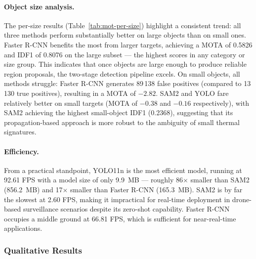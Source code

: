 \documentclass[
]{article}
\begin{document}
\paragraph{Object size analysis.}
The per-size results (Table~\ref{tab:mot-per-size}) highlight a consistent trend: all three methods perform substantially better on large objects than on small ones. Faster R-CNN benefits the most from larger targets, achieving a MOTA of 0.5826 and IDF1 of 0.8076 on the large subset — the highest scores in any category or size group. This indicates that once objects are large enough to produce reliable region proposals, the two-stage detection pipeline excels. On small objects, all methods struggle: Faster R-CNN generates 89\,138 false positives (compared to 13\,130 true positives), resulting in a MOTA of $-2.82$. SAM2 and YOLO fare relatively better on small targets (MOTA of $-0.38$ and $-0.16$ respectively), with SAM2 achieving the highest small-object IDF1 (0.2368), suggesting that its propagation-based approach is more robust to the ambiguity of small thermal signatures.

\paragraph{Efficiency.}
From a practical standpoint, YOLO11n is the most efficient model, running at 92.61 FPS with a model size of only 9.9~MB — roughly 86$\times$ smaller than SAM2 (856.2~MB) and 17$\times$ smaller than Faster R-CNN (165.3~MB). SAM2 is by far the slowest at 2.60 FPS, making it impractical for real-time deployment in drone-based surveillance scenarios despite its zero-shot capability. Faster R-CNN occupies a middle ground at 66.81 FPS, which is sufficient for near-real-time applications.

\hypertarget{Qualitative Results}{%
\subsubsection{Qualitative Results}\label{MOT_Qualitative}}
\end{document}
